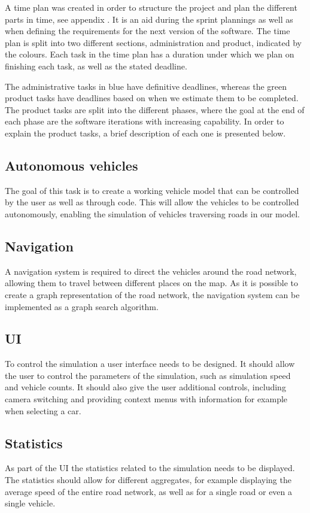 
A time plan was created in order to structure the project and plan the different parts in time, see appendix . It is an aid during the sprint plannings as well as when defining the requirements for the next version of the software. The time plan is split into two different sections, administration and product, indicated by the colours. Each task in the time plan has a duration under which we plan on finishing each task, as well as the stated deadline.

The administrative tasks in blue have definitive deadlines, whereas the green product tasks have deadlines based on when we estimate them to be completed. The product tasks are split into the different phases, where the goal at the end of each phase are the software iterations with increasing capability. In order to explain the product tasks, a brief description of each one is presented below.

\subsection{Autonomous vehicles}
    The goal of this task is to create a working vehicle model that can be controlled by the user as well as through code. This will allow the vehicles to be controlled autonomously, enabling the simulation of vehicles traversing roads in our model.

\subsection{Navigation}
    A navigation system is required to direct the vehicles around the road network, allowing them to travel between different places on the map. As it is possible to create a graph representation of the road network, the navigation system can be implemented as a graph search algorithm.

\subsection{UI}
    To control the simulation a user interface needs to be designed. It should allow the user to control the parameters of the simulation, such as simulation speed and vehicle counts. It should also give the user additional controls, including camera switching and providing context menus with information for example when selecting a car.

\subsection{Statistics}
    As part of the UI the statistics related to the simulation needs to be displayed. The statistics should allow for different aggregates, for example displaying the average speed of the entire road network, as well as for a single road or even a single vehicle.

